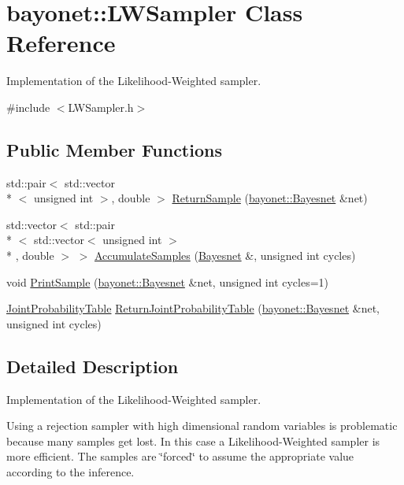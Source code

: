 \hypertarget{classbayonet_1_1_l_w_sampler}{\section{bayonet\-:\-:L\-W\-Sampler Class Reference}
\label{classbayonet_1_1_l_w_sampler}
}


Implementation of the Likelihood-\/\-Weighted sampler.  




{\ttfamily \#include $<$L\-W\-Sampler.\-h$>$}

\subsection*{Public Member Functions}
\begin{DoxyCompactItemize}
\item 
std\-::pair$<$ std\-::vector\\*
$<$ unsigned int $>$, double $>$ \hyperlink{classbayonet_1_1_l_w_sampler_a1da2655dd3332796a3293c3aac8d618d}{Return\-Sample} (\hyperlink{classbayonet_1_1_bayesnet}{bayonet\-::\-Bayesnet} \&net)
\item 
std\-::vector$<$ std\-::pair\\*
$<$ std\-::vector$<$ unsigned int $>$\\*
, double $>$ $>$ \hyperlink{classbayonet_1_1_l_w_sampler_abd25d8f7eb12dd345dbfc8984cadcdbf}{Accumulate\-Samples} (\hyperlink{classbayonet_1_1_bayesnet}{Bayesnet} \&, unsigned int cycles)
\item 
void \hyperlink{classbayonet_1_1_l_w_sampler_a010eacc55fbbb462f50b7ab6b292056f}{Print\-Sample} (\hyperlink{classbayonet_1_1_bayesnet}{bayonet\-::\-Bayesnet} \&net, unsigned int cycles=1)
\item 
\hyperlink{classbayonet_1_1_joint_probability_table}{Joint\-Probability\-Table} \hyperlink{classbayonet_1_1_l_w_sampler_af2fd4c51a13c8cc95f5eaca05941eb47}{Return\-Joint\-Probability\-Table} (\hyperlink{classbayonet_1_1_bayesnet}{bayonet\-::\-Bayesnet} \&net, unsigned int cycles)
\end{DoxyCompactItemize}


\subsection{Detailed Description}
Implementation of the Likelihood-\/\-Weighted sampler. 

Using a rejection sampler with high dimensional random variables is problematic because many samples get lost. In this case a Likelihood-\/\-Weighted sampler is more efficient. The samples are \char`\"{}forced\char`\"{} to assume the appropriate value according to the inference. 

